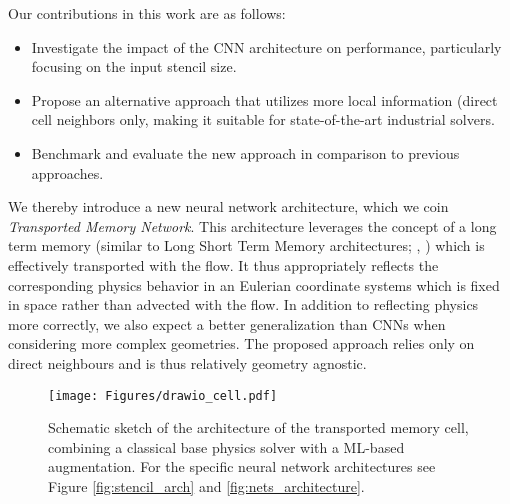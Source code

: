 Our contributions in this work are as follows:
\begin{itemize}
  \item Investigate the impact of the CNN architecture on performance, particularly focusing on the input stencil size.
  \item Propose an alternative approach that utilizes more local information (direct cell neighbors only, making it suitable for state-of-the-art industrial solvers.
  \item Benchmark and evaluate the new approach in comparison to previous approaches.
\end{itemize}

We thereby introduce a new neural network architecture, which we coin \textit{Transported Memory Network}. This architecture leverages the concept of a long term memory (similar to Long Short Term Memory architectures; \citeauthor{hochreiter1997long}, \citeyear{hochreiter1997long}) which is effectively transported with the flow. It thus appropriately reflects the corresponding physics behavior in an Eulerian coordinate systems which is fixed in space rather than advected with the flow. In addition to reflecting physics more correctly, we also expect a better generalization than CNNs when considering more complex geometries. The proposed approach relies only on direct neighbours and is thus relatively geometry agnostic. 


\begin{figure}[H]
    \centering
    \texttt{[image: Figures/drawio\_cell.pdf]}
    \caption{Schematic sketch of the architecture of the transported memory cell, combining a classical base physics solver with a ML-based augmentation. For the specific neural network architectures see Figure \ref{fig:stencil_arch} and \ref{fig:nets_architecture}.} 
    \label{fig:cell}
\end{figure}

